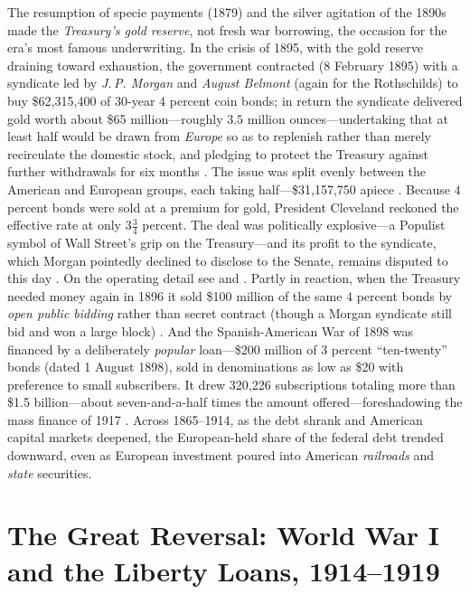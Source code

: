 \documentclass[12pt]{article}
\begin{document}
The resumption of specie payments (1879) and the silver agitation of the 1890s
made the \emph{Treasury's gold reserve}, not fresh war borrowing, the occasion
for the era's most famous underwriting. In the crisis of 1895, with the gold
reserve draining toward exhaustion, the government contracted (8 February 1895)
with a syndicate led by \emph{J.\,P. Morgan} and \emph{August Belmont} (again for
the Rothschilds) to buy \$62{,}315{,}400 of $30$-year $4$ percent coin bonds; in
return the syndicate delivered gold worth about \$65 million---roughly $3.5$
million ounces---undertaking that at least half would be drawn from \emph{Europe}
so as to replenish rather than merely recirculate the domestic stock, and
pledging to protect the Treasury against further withdrawals for six months
\citep{cleveland1895message, ferguson1999house}. The issue was split evenly
between the American and European groups, each taking half---\$31{,}157{,}750
apiece \citep[339]{carosso1987morgans}. Because $4$ percent bonds were sold at a
premium for gold, President Cleveland reckoned the effective rate at only
$3\tfrac{3}{4}$ percent. The deal was politically explosive---a Populist symbol
of Wall Street's grip on the Treasury---and its profit to the syndicate, which
Morgan pointedly declined to disclose to the Senate, remains disputed to this day
\citep[234]{noyes1909forty}. On the operating detail see
\citet[319--340]{carosso1987morgans} and \citet[73--78]{chernow1990house}.
Partly in reaction, when the Treasury needed money again in 1896 it sold \$100
million of the same $4$ percent bonds by \emph{open public bidding} rather than
secret contract (though a Morgan syndicate still bid and won a large block)
\citep[256]{noyes1909forty}.
And the Spanish-American War of 1898 was financed by a deliberately \emph{popular}
loan---\$200 million of $3$ percent ``ten-twenty'' bonds (dated 1 August 1898),
sold in denominations as low as \$20 with preference to small subscribers. It
drew 320{,}226 subscriptions totaling more than \$1.5 billion---about
seven-and-a-half times the amount offered---foreshadowing the mass finance of
1917 \citep{noyes1909forty, dewey1903financial}. Across 1865--1914, as the debt
shrank and American capital markets deepened, the European-held share of the
federal debt trended downward, even as European investment poured into American
\emph{railroads} and \emph{state} securities.

\section{The Great Reversal: World War I and the Liberty Loans, 1914--1919}
\end{document}
